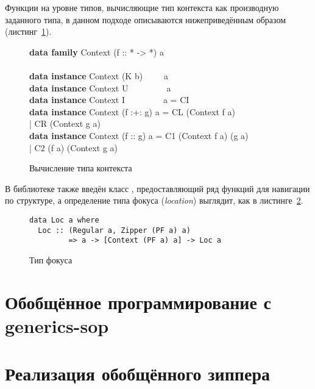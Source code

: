 Функции на уровне типов, вычисляющие тип контекста как производную заданного типа, в данном подходе описываются нижеприведённым образом (листинг~\ref{list:ctx}).
\begin{figure}[h]
\begin{framed}
\ttfamily\small
\textbf{data family} Context (f :: * -> *) a\\
\\
\textbf{data instance} Context (K b)~~~~~a\\
\textbf{data instance} Context U~~~~~~~~~a\\
\textbf{data instance} Context I~~~~~~~~~a = CI\\
\textbf{data instance} Context (f :+: g) a = CL (Context f a)\\
\indN{~~~~~~~~~~~~~~~~~~~~~~~~~~~~~~~~~~}| CR (Context g a)\\
\textbf{data instance} Context (f :\tms: g) a = C1 (Context f a) (g a)\\
\indN{~~~~~~~~~~~~~~~~~~~~~~~~~~~~~~~~~~}| C2 (f a) (Context g a)
\end{framed}
\caption{Вычисление типа контекста}
\label{list:ctx}
\end{figure}

В библиотеке также введён класс , предоставляющий ряд функций для навигации по структуре, а определение типа фокуса (\textsl{location}) выглядит, как в листинге~\ref{list:loc}.
\begin{figure}[h]
\begin{framed}
\vspace{-0.25cm}
\begin{lstlisting}
data Loc a where
  Loc :: (Regular a, Zipper (PF a) a)
         => a -> [Context (PF a) a] -> Loc a
\end{lstlisting}
\vspace{-0.25cm}
\end{framed}
\caption{Тип фокуса}
\label{list:loc}
\end{figure}

\section{Обобщённое программирование с \textsf{generics-sop}}
\label{sec:generics-sop}

\section{Реализация обобщённого зиппера}
\label{sec:generic-zippers-sop}

